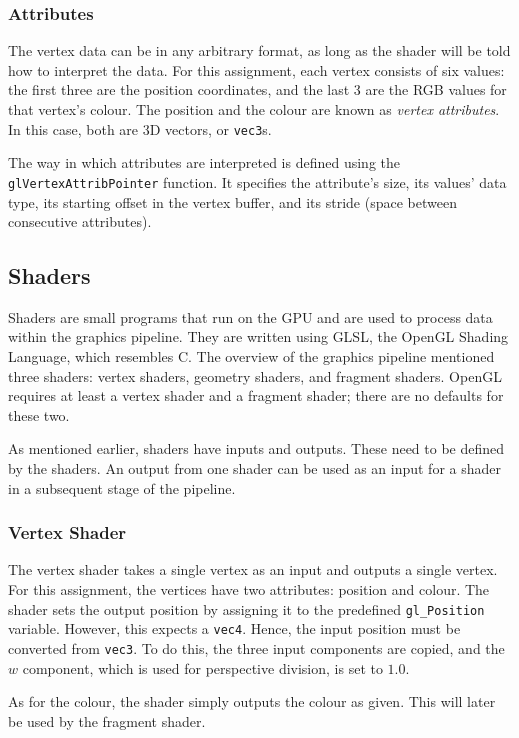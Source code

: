 \documentclass[a4paper, 12pt]{scrartcl}
\begin{document}
\subsubsection{Attributes}
The vertex data can be in any arbitrary format, as long as the shader will be told how to interpret the data. For this assignment, each vertex consists of six values: the first three are the position coordinates, and the last 3 are the RGB values for that vertex's colour. The position and the colour are known as \textit{vertex attributes}. In this case, both are 3D vectors, or \texttt{vec3}s.

The way in which attributes are interpreted is defined using the \texttt{glVertexAttribPointer} function. It specifies the attribute's size, its values' data type, its starting offset in the vertex buffer, and its stride (space between consecutive attributes).

\subsection{Shaders}
Shaders are small programs that run on the GPU and are used to process data within the graphics pipeline. They are written using GLSL, the OpenGL Shading Language, which resembles C. The overview of the graphics pipeline mentioned three shaders: vertex shaders, geometry shaders, and fragment shaders. OpenGL requires at least a vertex shader and a fragment shader; there are no defaults for these two.

As mentioned earlier, shaders have inputs and outputs. These need to be defined by the shaders. An output from one shader can be used as an input for a shader in a subsequent stage of the pipeline.

\subsubsection{Vertex Shader}
The vertex shader takes a single vertex as an input and outputs a single vertex. For this assignment, the vertices have two attributes: position and colour. The shader sets the output position by assigning it to the predefined \texttt{gl\_Position} variable. However, this expects a \texttt{vec4}. Hence, the input position must be converted from \texttt{vec3}. To do this, the three input components are copied, and the $w$ component, which is used for perspective division, is set to $1.0$.

As for the colour, the shader simply outputs the colour as given. This will later be used by the fragment shader.
\end{document}
